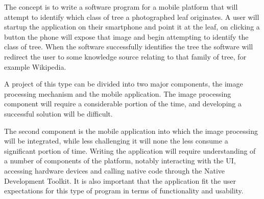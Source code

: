 The concept is to write a software program for a mobile platform that will attempt to identify which class of tree a photographed leaf originates. A user will startup the application on their smartphone and point it at the leaf, on clicking a button the phone will expose that image and begin attempting to identify the class of tree. When the software successfully identifies the tree the software will redirect the user to some knowledge source relating to that family of tree, for example Wikipedia.

A project of this type can be divided into two major components, the image processing mechanism and the mobile application. The image processing component will require a considerable portion of the time, and developing a successful solution will be difficult.

The second component is the mobile application into which the image processing will be integrated, while less challenging it will none the less consume a significant portion of time. Writing the application will require understanding of a number of components of the platform, notably interacting with the UI, accessing hardware devices and calling native code through the Native Development Toolkit. It is also important that the application fit the user expectations for this type of program in terms of functionality and usability.







